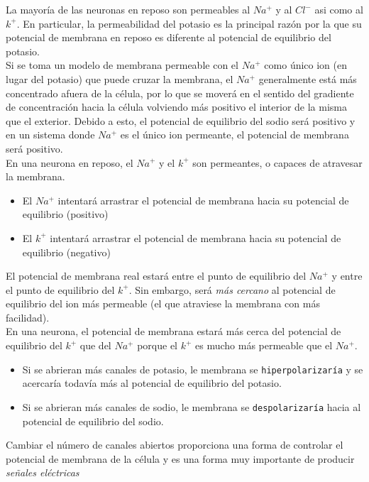 La mayoría de las neuronas en reposo son permeables al $Na^+$ y al $Cl^-$ asi como al $k^+$. En particular, la permeabilidad del potasio es la principal razón por la que su potencial de membrana en reposo es diferente al potencial de equilibrio del potasio.\\
Si se toma un modelo de membrana permeable con el $Na^+$ como único ion (en lugar del potasio) que puede cruzar la membrana, el $Na^+$ generalmente está más concentrado afuera de la célula, por lo que se moverá en el sentido del gradiente de concentración hacia la célula volviendo más positivo el interior de la misma que el exterior. Debido a esto, el potencial de equilibrio del sodio será positivo y en un sistema donde $Na^+$ es el único ion permeante, el potencial de membrana será positivo.\\
En una neurona en reposo, el $Na^+$ y el $k^+$ son permeantes, o capaces de atravesar la membrana.
\begin{itemize}
    \item El $Na^+$ intentará arrastrar el potencial de membrana hacia su potencial de equilibrio (positivo)
    \item El $k^+$ intentará arrastrar el potencial de membrana hacia su potencial de equilibrio (negativo)
\end{itemize}
El potencial de membrana real estará entre el punto de equilibrio del $Na^+$ y entre el punto de equilibrio del $k^+$. Sin embargo, será \textit{más cercano} al potencial de equilibrio del ion más permeable (el que atraviese la membrana con más facilidad).\\
En una neurona, el potencial de membrana estará más cerca del potencial de equilibrio del $k^+$ que del $Na^+$ porque el $k^+$ es mucho más permeable que el $Na^+$.
\begin{itemize}
    \item Si se abrieran más canales de potasio, le membrana se \texttt{hiperpolarizaría} y se acercaría todavía más al potencial de equilibrio del potasio.
    \item Si se abrieran más canales de sodio, le membrana se \texttt{despolarizaría} hacia al potencial de equilibrio del sodio.
\end{itemize}
Cambiar el número de canales abiertos proporciona una forma de controlar el potencial de membrana de la célula y es una forma muy importante de producir \textit{señales eléctricas}
\newpage
